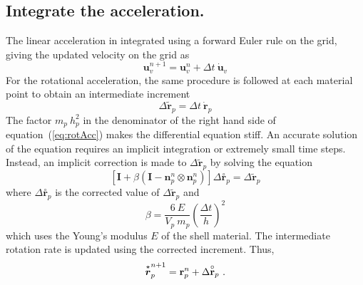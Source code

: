     \subsection{ Integrate the acceleration.}
       The linear acceleration in integrated using a forward Euler 
       rule on the grid, giving the updated velocity on the grid as
       \begin{equation} 
         \mathbf{u}_v^{n+1} = \mathbf{u}_v^n + \Delta t~\mathbf{\dot{u}}_v 
       \end{equation} 
       For the rotational acceleration, the same procedure is followed
       at each material point to obtain an intermediate increment
       \begin{equation} 
         \Delta\mathbf{\tilde{r}}_p = \Delta t~\mathbf{\dot{r}}_p 
       \end{equation} 
       The factor $m_p~h^2_p$ in the denominator of the right hand side of
       equation~(\ref{eq:rotAcc}) makes the differential equation stiff.
       An accurate solution of the equation requires an implicit integration
       or extremely small time steps.   Instead, an implicit correction is 
       made to $\Delta\mathbf{\tilde{r}}_p$ by solving the 
       equation~\cite{Kashiwa2002}
       \begin{equation}
          \left[\mathbf{I} + 
            \beta\left(\mathbf{I} - \mathbf{n}_p^n\otimes\mathbf{n}_p^n\right)
            \right]
            \Delta\overset{\circ}{\mathbf{r}}_p = 
            \Delta\mathbf{\tilde{r}}_p
       \end{equation}
       where $\Delta\overset{\circ}{\mathbf{r}}_p$ is the corrected value
       of $\Delta\mathbf{\tilde{r}}_p$ and
       \begin{equation}
         \beta = \frac{6~E}{V_p~m_p}\left(\frac{\Delta t}{h}\right)^2
       \end{equation}
       which uses the Young's modulus $E$ of the shell material.
       The intermediate rotation rate is updated using the corrected 
       increment.  Thus,
       \begin{equation} 
         \overset{\star}{\boldsymbol{r}}_p^{n+1} = \mathbf{r}_p^n + 
            \Delta\overset{\circ}{\mathbf{r}}_p~.
       \end{equation} 
